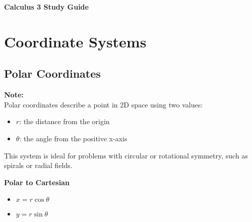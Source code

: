 \documentclass[10pt]{article}                               %
\begin{document}
\begin{center}
    {\Huge \textbf{Calculus 3 Study Guide}} \\
    \vspace{0.5em}
\end{center}


\section*{Coordinate Systems}


\begin{adjustwidth}{2em}{0pt}

    \subsection*{Polar Coordinates}

    \begin{adjustwidth}{2em}{0pt}

        \begin{notebox}

            \textbf{Note:} \\
            Polar coordinates describe a point in 2D space using two values:

            \begin{itemize}
                \item \( r \): the distance from the origin
                \item \( \theta \): the angle from the positive x-axis
            \end{itemize}

            This system is ideal for problems with circular or rotational symmetry, such as spirals or radial fields.

        \end{notebox}


        \vspace{0.5em}

        \textbf{Polar to Cartesian}

        \begin{itemize}
            \item \( x = r\cos\theta \)
            \item \( y = r\sin\theta \)
        \end{itemize}


\end{adjustwidth}
\end{adjustwidth}
\end{document}
